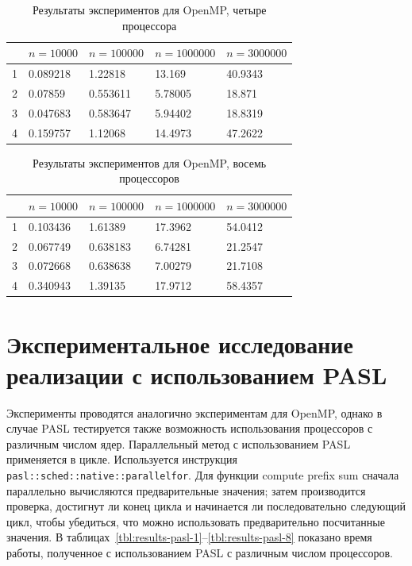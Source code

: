 \documentclass[specification,annotation]{itmo-student-thesis}
\begin{document}
\begin{table}[!ht]
\centering
\begin{tabular}{|l|l|l|l|l|}\hline
 & $n=10000$ & $n=100000$ & $n=1000000$ & $n=3000000$ \\\hline
1 & 0.089218 & 1.22818 & 13.169 & 40.9343 \\\hline
2 & 0.07859 & 0.553611 & 5.78005 & 18.871 \\\hline
3 & 0.047683 & 0.583647 & 5.94402 & 18.8319 \\\hline
4 & 0.159757 & 1.12068 & 14.4973 & 47.2622 \\\hline
\end{tabular}
\caption{Результаты экспериментов для OpenMP, четыре процессора}\label{tbl:results-openmp-4}
\end{table}

\begin{table}[!ht]
\centering
\begin{tabular}{|l|l|l|l|l|}\hline
 & $n=10000$ & $n=100000$ & $n=1000000$ & $n=3000000$ \\\hline
1 & 0.103436 & 1.61389 & 17.3962 & 54.0412 \\\hline
2 & 0.067749 & 0.638183 & 6.74281 & 21.2547 \\\hline
3 & 0.072668 & 0.638638 & 7.00279 & 21.7108 \\\hline
4 & 0.340943 & 1.39135 & 17.9712 & 58.4357 \\\hline
\end{tabular}
\caption{Результаты экспериментов для OpenMP, восемь процессоров}\label{tbl:results-openmp-8}
\end{table}

\section{Экспериментальное исследование реализации с использованием PASL}

Эксперименты проводятся аналогично экспериментам для OpenMP, однако в случае PASL тестируется также возможность использования процессоров с различным числом ядер. 
Параллельный метод с использованием PASL применяется в цикле. Используется инструкция 
\texttt{pasl::sched::native::parallel{\textunderscore}for}. Для функции compute prefix sum сначала 
параллельно вычисляются предварительные значения; затем производится проверка, достигнут ли конец 
цикла и начинается ли последовательно следующий цикл, чтобы убедиться, что можно использовать 
предварительно посчитанные значения. В таблицах~\ref{tbl:results-pasl-1}--\ref{tbl:results-pasl-8} 
показано время работы, полученное с использованием PASL с различным числом процессоров.
\end{document}
